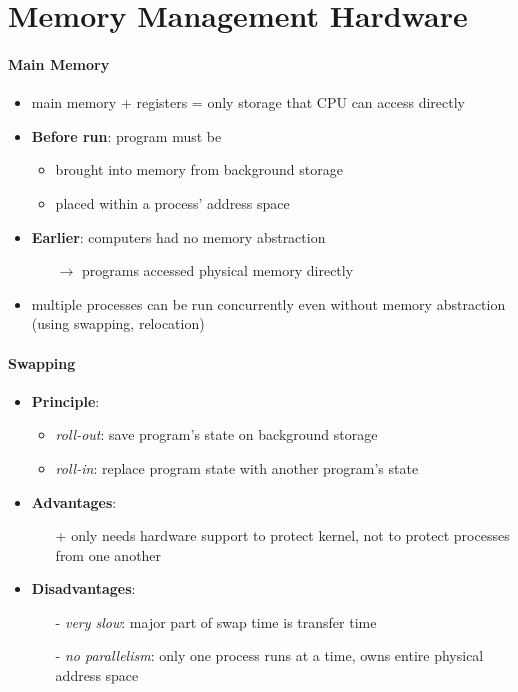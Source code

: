 \section{Memory Management Hardware}

\paragraph{Main Memory}
\begin{itemize}
  \item main memory + registers = only storage that CPU can access directly
  \item \textbf{Before run}: program must be
  \begin{itemize}
    \item brought into memory from background storage
    \item placed within a process' address space
  \end{itemize}
  \item \textbf{Earlier}: computers had no memory abstraction
  \begin{itemize}
    \item[$ \to $] programs accessed physical memory directly
  \end{itemize}
  \item multiple processes can be run concurrently even without memory abstraction (using swapping, relocation)
\end{itemize}

\paragraph{Swapping}
\begin{itemize}
  \item \textbf{Principle}:
  \begin{itemize}
    \item \emph{roll-out}: save program's state on background storage
    \item \emph{roll-in}: replace program state with another program's state
  \end{itemize}
  \item \textbf{Advantages}:
  \begin{itemize}
    \item[+] only needs hardware support to protect kernel, not to protect processes from one another
  \end{itemize}
  \item \textbf{Disadvantages}:
  \begin{itemize}
    \item[-] \emph{very slow}: major part of swap time is transfer time
    \item[-] \emph{no parallelism}: only one process runs at a time, owns entire physical address space
  \end{itemize}
\end{itemize}

